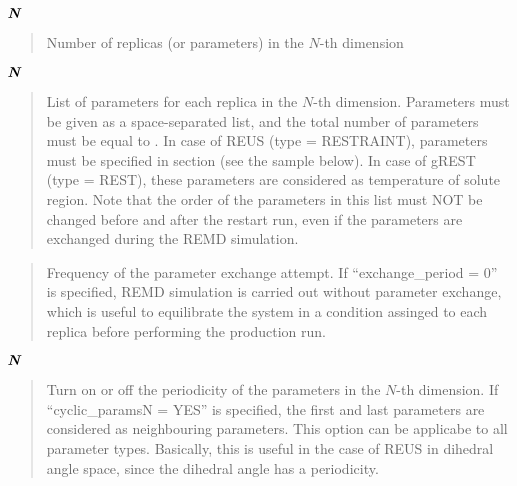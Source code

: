\documentclass[a4paper,11pt,oneside,english]{sphinxmanual}
\begin{document}
\(\textbf{\textit{N}}\) 
\begin{quote}


Number of replicas (or parameters) in the \(N\)-th dimension
\end{quote}

\(\textbf{\textit{N}}\) 
\begin{quote}


List of parameters for each replica in the \(N\)-th dimension.
Parameters must be given as a space-separated list,
and the total number of parameters must be equal to .
In case of REUS (type = RESTRAINT), parameters must be
specified in \sphinxstylestrong{{[}RESTRAINTS{]}} section (see the sample below).
In case of gREST (type = REST), these parameters are considered
as temperature of solute region.
Note that the order of the parameters in this list must NOT be changed
before and after the restart run, even if the parameters are exchanged
during the REMD simulation.
\end{quote}

 
\begin{quote}


Frequency of the parameter exchange attempt.
If “exchange\_period = 0” is specified,
REMD simulation is carried out without parameter exchange,
which is useful to equilibrate the system in a condition
assinged to each replica before performing the production run.
\end{quote}

\(\textbf{\textit{N}}\) 
\begin{quote}


Turn on or off the periodicity of the parameters in the \(N\)-th dimension.
If “cyclic\_paramsN = YES” is specified, the first and last parameters are
considered as neighbouring parameters.
This option can be applicabe to all parameter types.
Basically, this is useful in the case of REUS in dihedral angle space,
since the dihedral angle has a periodicity.
\end{quote}
\end{document}
